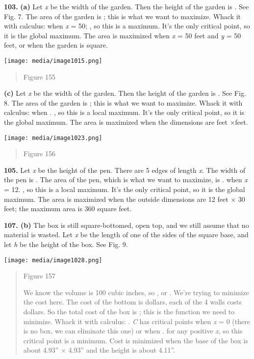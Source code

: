 \textbf{103.} \textbf{(a)} Let \emph{x} be the width of the garden. Then
the height of the garden is . See Fig. 7. The area of the garden is ;
this is what we want to maximize. Whack it with calculus: when \emph{x}
= 50; , so this is a maximum. It's the only critical point, so it is the
global maximum. The area is maximized when \emph{x} = 50 feet and
\emph{y} = 50 feet, or when the garden is square.

\texttt{[image: media/image1015.png]}

\begin{quote}
Figure 155
\end{quote}

\textbf{(c)} Let \emph{x} be the width of the garden. Then the height of
the garden is . See Fig. 8. The area of the garden is ; this is what we
want to maximize. Whack it with calculus: when . , so this is a local
maximum. It's the only critical point, so it is the global maximum. The
area is maximized when the dimensions are feet ×feet.

\texttt{[image: media/image1023.png]}

\begin{quote}
Figure 156
\end{quote}

\textbf{105.} Let \emph{x} be the height of the pen. There are 5 edges
of length \emph{x}. The width of the pen is . The area of the pen, which
is what we want to maximize, is . when \emph{x} = 12. , so this is a
local maximum. It's the only critical point, so it is the global
maximum. The area is maximized when the outside dimensions are 12 feet ×
30 feet; the maximum area is 360 square feet.

\textbf{107. (b)} The box is still square-bottomed, open top, and we
still assume that no material is wasted. Let \emph{x} be the length of
one of the sides of the square base, and let \emph{h} be the height of
the box. See Fig. 9.

\texttt{[image: media/image1028.png]}

\begin{quote}
Figure 157

We know the volume is 100 cubic inches, so , or . We're trying to
minimize the cost here. The cost of the bottom is dollars, each of the 4
walls costs dollars. So the total cost of the box is ; this is the
function we need to minimize. Whack it with calculus: . \emph{C} has
critical points when \emph{x} = 0 (there is no box, we can eliminate
this one) or when . for any positive \emph{x}, so this critical point is
a minimum. Cost is minimized when the base of the box is about 4.93'' ×
4.93'' and the height is about 4.11''.
\end{quote}

